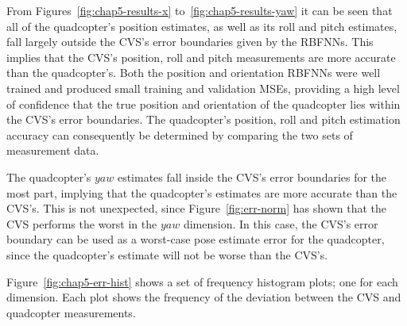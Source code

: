 From Figures~\ref{fig:chap5-results-x} to~\ref{fig:chap5-results-yaw} it can be seen that all of the quadcopter's position estimates, as well as its roll and pitch estimates, fall largely outside the CVS's error boundaries given by the RBFNNs. This implies that the CVS's position, roll and pitch measurements are more accurate than the quadcopter's. Both the position and orientation RBFNNs were well trained and produced small training and validation MSEs, providing a high level of confidence that the true position and orientation of the quadcopter lies within the CVS's error boundaries. The quadcopter's position, roll and pitch estimation accuracy can consequently be determined by comparing the two sets of measurement data. 

The quadcopter's $yaw$ estimates fall inside the CVS's error boundaries for the most part, implying that the quadcopter's estimates are more accurate than the CVS's. This is not unexpected, since Figure~\ref{fig:err-norm} has shown that the CVS performs the worst in the $yaw$ dimension. In this case, the CVS's error boundary can be used as a worst-case pose estimate error for the quadcopter, since the quadcopter's estimate will not be worse than the CVS's.

Figure~\ref{fig:chap5-err-hist} shows a set of frequency histogram plots; one for each dimension. Each plot shows the frequency of the deviation between the CVS and quadcopter measurements.

